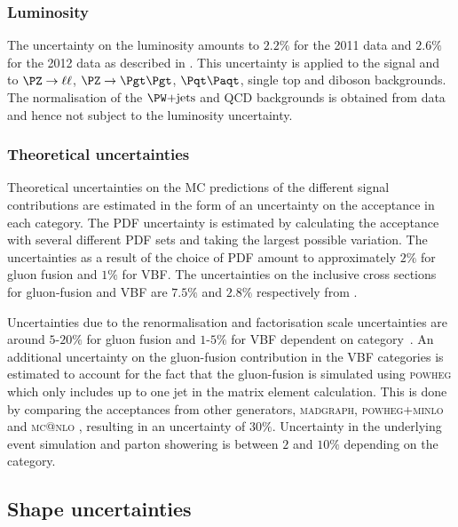 \subsubsection{\textbf{Luminosity}} 
The uncertainty on the luminosity amounts to $2.2\%$ for the 2011 data and
$2.6\%$ for the 2012 data as described in \cite{CMS-PAS-SMP-12-008,CMS-PAS-LUM-13-001}.
This uncertainty is applied to the signal and to $\PZ \to \ell\ell$, $\PZ \to
\Pgt\Pgt$, $\ttbar$, single top and diboson backgrounds. 
The normalisation of the $\WJets$ and QCD backgrounds is obtained from data and hence not subject to the luminosity uncertainty.

\subsubsection{\textbf{Theoretical uncertainties}} 
Theoretical uncertainties on the \ac{MC} predictions of the different signal
contributions are estimated in the form of an uncertainty on the acceptance in
each category. The \ac{PDF} uncertainty is estimated by calculating the
acceptance with several different \ac{PDF} sets and taking the largest possible
variation. The uncertainties as a result of the choice of \ac{PDF} amount to
approximately $2\%$ for gluon fusion and $1\%$ for \ac{VBF}. The uncertainties
on the inclusive cross sections for gluon-fusion and \ac{VBF} are $7.5\%$ and
$2.8\%$ respectively from
\cite{LHCHiggsCrossSectionWorkingGroup:2011ti,Dittmaier:2012vm,Heinemeyer:2013tqa}.

Uncertainties due to the renormalisation and factorisation scale uncertainties
are around $5$-$20\%$ for gluon fusion and $1$-$5\%$ for \ac{VBF} dependent on
category~\cite{HIG-13-004}. An additional uncertainty on the gluon-fusion contribution in the
VBF categories is estimated to account for the fact that the gluon-fusion is
simulated using \textsc{powheg} which only includes up to one jet in the matrix
element calculation. This is done by comparing the acceptances from other
generators, \textsc{madgraph}, \textsc{powheg+minlo} \cite{Hamilton:2012np} and
\textsc{mc@nlo} \cite{Frixione:2002ik}, resulting in an uncertainty of $30\%$.
Uncertainty in the underlying event simulation and parton showering is between
$2$ and $10\%$ depending on the category. 


\subsection{Shape uncertainties}
\label{sec:systematicUncertainties_shape}

